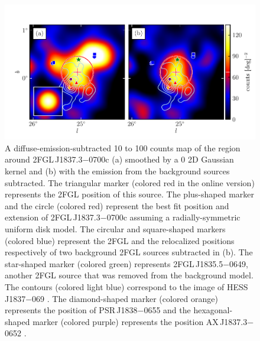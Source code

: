 \begin{figure}[htbp]
  \includegraphics{chapters/extended_search/figures/source_plots/source_HESS_J1837-069_color.pdf}
  \caption{A diffuse-emission-subtracted 10 \gev to 100 \gev counts map
  of the region around 2FGL\,J1837.3$-$0700c (a) smoothed by a 0
  2D Gaussian kernel and (b) with the emission from the background
  sources subtracted.  The triangular marker (colored red in the online
  version) represents the 2FGL position of this source.  The plus-shaped
  marker and the circle (colored red) represent the best fit position
  and extension of 2FGL\,J1837.3$-$0700c assuming a radially-symmetric
  uniform disk model.  The circular and square-shaped markers (colored
  blue) represent the 2FGL and the relocalized positions respectively
  of two background 2FGL sources subtracted in (b).  The star-shaped
  marker (colored green) represents 2FGL\,J1835.5$-$0649, another 2FGL
  source that was removed from the background model.  The contours
  (colored light blue) correspond to the \tev image of HESS\,J1837$-$069
  \citep{aharonian_2006a_h.e.s.s.-survey}.  The diamond-shaped marker
  (colored orange) represents the position of PSR\,J1838$-$0655 and
  the hexagonal-shaped marker (colored purple) represents the position
  AX\,J1837.3$-$0652 \citep{gotthelf_2008a_discovery-young}.}
\end{figure}

